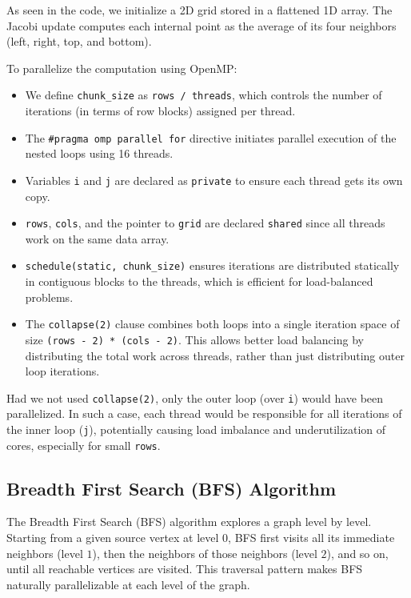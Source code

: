\documentclass[12pt]{book}
\begin{document}
As seen in the code, we initialize a 2D grid stored in a flattened 1D array. The Jacobi update computes each internal point as the average of its four neighbors (left, right, top, and bottom).

To parallelize the computation using OpenMP:
\begin{itemize}
    \item We define \texttt{chunk\_size} as \texttt{rows / threads}, which controls the number of iterations (in terms of row blocks) assigned per thread.
    \item The \texttt{\#pragma omp parallel for} directive initiates parallel execution of the nested loops using 16 threads.
    \item Variables \texttt{i} and \texttt{j} are declared as \texttt{private} to ensure each thread gets its own copy.
    \item \texttt{rows}, \texttt{cols}, and the pointer to \texttt{grid} are declared \texttt{shared} since all threads work on the same data array.
    \item \texttt{schedule(static, chunk\_size)} ensures iterations are distributed statically in contiguous blocks to the threads, which is efficient for load-balanced problems.
    \item The \texttt{collapse(2)} clause combines both loops into a single iteration space of size \texttt{(rows - 2) * (cols - 2)}. This allows better load balancing by distributing the total work across threads, rather than just distributing outer loop iterations.
\end{itemize}

Had we not used \texttt{collapse(2)}, only the outer loop (over \texttt{i}) would have been parallelized. In such a case, each thread would be responsible for all iterations of the inner loop (\texttt{j}), potentially causing load imbalance and underutilization of cores, especially for small \texttt{rows}.



\subsection{Breadth First Search (BFS) Algorithm}

The Breadth First Search (BFS) algorithm explores a graph level by level. Starting from a given source vertex at level $0$, BFS first visits all its immediate neighbors (level $1$), then the neighbors of those neighbors (level $2$), and so on, until all reachable vertices are visited. This traversal pattern makes BFS naturally parallelizable at each level of the graph.
\end{document}
